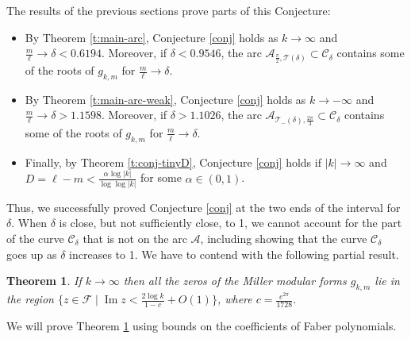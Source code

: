 \documentclass[12pt]{amsart}
\theoremstyle{plain} %
\newtheorem{theorem}    {Theorem}
\theoremstyle{definition}
\theoremstyle{remark}
\numberwithin{equation}{section}
\renewcommand{\Im}{\operatorname{Im}}
\begin{document}
The results of the previous sections prove parts of this
Conjecture:
\begin{itemize}
\item By Theorem \ref{t:main-arc}, Conjecture \ref{conj} holds as $k\to \infty$ and
$\frac{m}{\ell}\to \delta<0.6194$. Moreover, if $\delta<0.9546$, the arc $\mathcal{A}_{\frac{\pi}{2},\mathcal{T}(\delta)}\subset \mathcal{C}_\delta$ contains some of the roots of $g_{k,m}$ for $\frac{m}{\ell}\to \delta$. 
\item By Theorem \ref{t:main-arc-weak}, Conjecture \ref{conj} holds as $k\to -\infty$ and
$\frac{m}{\ell}\to \delta>1.1598$. Moreover, if $\delta>1.1026$,
the arc $\mathcal{A}_{\mathcal{T}_-(\delta),\frac{2\pi}{3}}\subset \mathcal{C}_\delta$ contains
some of the roots of $g_{k,m}$ for $\frac{m}{\ell}\to \delta$.
\item Finally, by Theorem \ref{t:conj-tinyD}, Conjecture \ref{conj} holds if $|k|\to\infty$ and $D=\ell-m<\frac{\alpha\log |k|}{\log\log|k|}$ for some $\alpha\in (0,1)$. 
\end{itemize}
Thus, we successfully proved Conjecture \ref{conj} at the two
ends of the interval for $\delta$. When $\delta$ is close, but
not sufficiently close, to 1, we cannot account for the part of
the curve $\mathcal{C}_\delta$ that is not on the arc
$\mathcal{A}$, including showing that the curve
$\mathcal{C}_\delta$ goes up as $\delta$ increases to 1. We have
to contend with the following partial result. 

\begin{theorem}\label{t:logk}
If $k\to \infty$ then all the zeros of the Miller modular forms $g_{k,m}$ lie in the region $\{z\in \mathcal{F}\mid \Im z < \frac{2\log k}{1-c}+O(1)\}$, where $c=\frac{e^{2\pi}}{1728}$.
\end{theorem}

We will prove Theorem \ref{t:logk} using bounds on the coefficients of Faber polynomials. 
\end{document}
